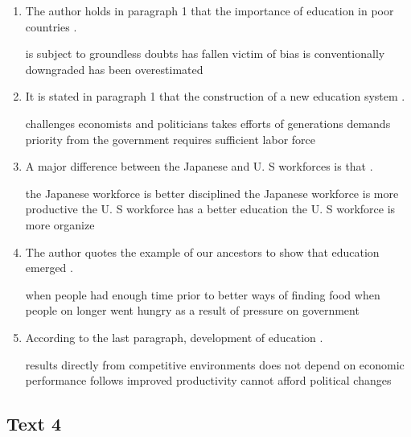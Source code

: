 {\begin{enumerate}[resume,]
	\item
The author holds in paragraph 1 that the importance of
education in poor countries \lineread.


\fourchoices
{is subject to groundless doubts}
{has fallen victim of bias}
{is conventionally downgraded}
{has been overestimated}



\item
 It is stated in paragraph 1 that the construction of a new
education system \lineread.


\fourchoices
{challenges economists and politicians}
{takes efforts of generations}
{demands priority from the government}
{requires sufficient labor force}



\item
 A major difference between the Japanese and U. S workforces
is that \lineread.


\fourchoices
{the Japanese workforce is better disciplined}
{the Japanese workforce is more productive}
{the U. S workforce has a better education}
{the U. S workforce is more organize}



\item
The author quotes the example of our ancestors to show that
education emerged \lineread.


\fourchoices
{when people had enough time}
{prior to better ways of finding food}
{when people on longer went hungry}
{as a result of pressure on government}



\item
According to the last paragraph, development of education \lineread.


\fourchoices
{results directly from competitive environments}
{does not depend on economic performance}
{follows improved productivity}
{cannot afford political changes}

\end{enumerate}
}


\newpage
\subsection{Text 4}


